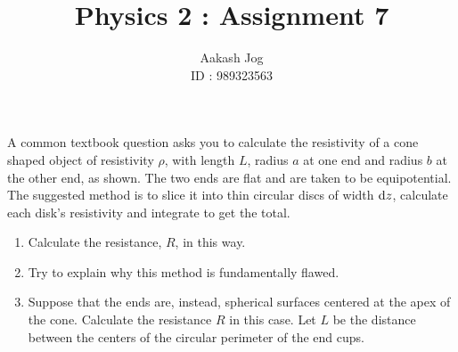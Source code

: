\documentclass[fleqn, a4paper, 11pt, oneside]{amsart}
\title{Physics 2 : Assignment 7}
\author
{
	Aakash Jog\\
	ID : 989323563
}
\date{\formatdate{13}{5}{2015}}
\theoremstyle{definition}
\theoremstyle{theorem}
\begin{document}
\maketitle

\begin{question}
	A common textbook question asks you to calculate the resistivity of a cone shaped object of resistivity $\rho$, with length $L$, radius $a$ at one end and radius $b$ at the other end, as shown.
	The two ends are flat and are taken to be equipotential.
	The suggested method is to slice it into thin circular discs of width $\dif z$, calculate each disk's resistivity and integrate to get the total.
	\begin{figure}[H]
	\end{figure}
	\begin{enumerate}
		\item Calculate the resistance, $R$, in this way.
		\item Try to explain why this method is fundamentally flawed.
		\item
			Suppose that the ends are, instead, spherical surfaces centered at the apex of the cone.
			Calculate the resistance $R$ in this case.
			Let $L$ be the distance between the centers of the circular perimeter of the end cups.
	\end{enumerate}
\end{question}
\end{document}
